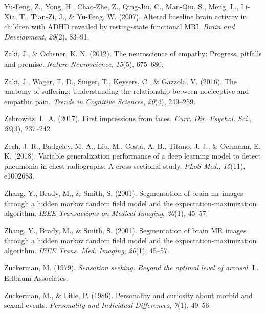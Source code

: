 \documentclass[11pt,american,a4paper,oneside,]{memoir} %
\begin{document}
\leavevmode\hypertarget{ref-Yu-Feng2007-sg}{}%
Yu-Feng, Z., Yong, H., Chao-Zhe, Z., Qing-Jiu, C., Man-Qiu, S., Meng, L., Li-Xia, T., Tian-Zi, J., \& Yu-Feng, W. (2007). Altered baseline brain activity in children with ADHD revealed by resting-state functional MRI. \emph{Brain and Development}, \emph{29}(2), 83--91.

\leavevmode\hypertarget{ref-zaki2012neuroscience}{}%
Zaki, J., \& Ochsner, K. N. (2012). The neuroscience of empathy: Progress, pitfalls and promise. \emph{Nature Neuroscience}, \emph{15}(5), 675--680.

\leavevmode\hypertarget{ref-zaki2016anatomy}{}%
Zaki, J., Wager, T. D., Singer, T., Keysers, C., \& Gazzola, V. (2016). The anatomy of suffering: Understanding the relationship between nociceptive and empathic pain. \emph{Trends in Cognitive Sciences}, \emph{20}(4), 249--259.

\leavevmode\hypertarget{ref-Zebrowitz2017-qe}{}%
Zebrowitz, L. A. (2017). First impressions from faces. \emph{Curr. Dir. Psychol. Sci.}, \emph{26}(3), 237--242.

\leavevmode\hypertarget{ref-Zech2018-bq}{}%
Zech, J. R., Badgeley, M. A., Liu, M., Costa, A. B., Titano, J. J., \& Oermann, E. K. (2018). Variable generalization performance of a deep learning model to detect pneumonia in chest radiographs: A cross-sectional study. \emph{PLoS Med.}, \emph{15}(11), e1002683.

\leavevmode\hypertarget{ref-zhang2001segmentation}{}%
Zhang, Y., Brady, M., \& Smith, S. (2001). Segmentation of brain mr images through a hidden markov random field model and the expectation-maximization algorithm. \emph{IEEE Transactions on Medical Imaging}, \emph{20}(1), 45--57.

\leavevmode\hypertarget{ref-Zhang2001-wa}{}%
Zhang, Y., Brady, M., \& Smith, S. (2001). Segmentation of brain MR images through a hidden markov random field model and the expectation-maximization algorithm. \emph{IEEE Trans. Med. Imaging}, \emph{20}(1), 45--57.

\leavevmode\hypertarget{ref-zuckerman1979}{}%
Zuckerman, M. (1979). \emph{Sensation seeking. Beyond the optimal level of arousal}. L. Erlbaum Associates.

\leavevmode\hypertarget{ref-zuckerman1986personality}{}%
Zuckerman, M., \& Litle, P. (1986). Personality and curiosity about morbid and sexual events. \emph{Personality and Individual Differences}, \emph{7}(1), 49--56.

\endgroup
\end{document}
